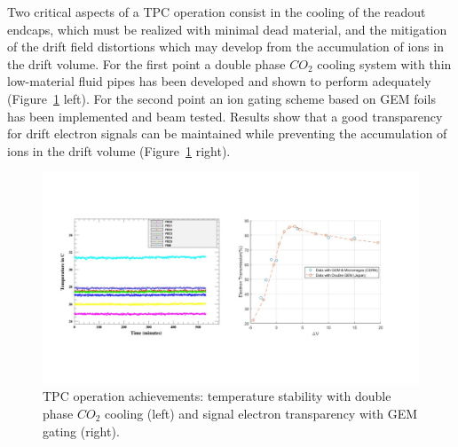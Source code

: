 \vspace{1cm}
Two critical aspects of a TPC operation consist in the cooling of the readout endcaps, which must be realized with minimal dead material, and the mitigation of the drift field distortions which may develop from the accumulation of ions in the drift volume. For the first point a double phase $CO_2$ cooling system with thin low-material fluid pipes has been developed and shown to perform adequately (Figure~\ref{fig:det:TPC_operation} left). For the second point an ion gating scheme based on GEM foils has been implemented and beam tested. Results show that a good transparency for drift electron signals can be maintained while preventing the accumulation of ions in the drift volume (Figure~\ref{fig:det:TPC_operation} right).   

\begin{figure}[t!]
\centering
\includegraphics[width=1.0\hsize]{Detector/fig/TPC_operation.jpg}
\caption{TPC operation achievements: temperature stability with double phase $CO_2$ cooling (left) and signal electron transparency with GEM gating (right).} 
\label{fig:det:TPC_operation}
\end{figure}

\vspace{2cm}